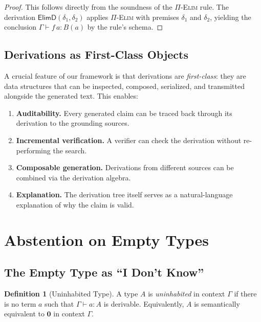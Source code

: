 \documentclass[11pt,a4paper]{article}
\theoremstyle{plain}
\theoremstyle{definition}
\newtheorem{definition}[theorem]{Definition}
\theoremstyle{remark}
\begin{document}
\begin{proof}
This follows directly from the soundness of the \textsc{$\Pi$-Elim} rule.
The derivation $\mathsf{ElimD}(\delta_1, \delta_2)$ applies \textsc{$\Pi$-Elim} with premises $\delta_1$ and $\delta_2$, yielding the conclusion $\Gamma \vdash f\,a : B(a)$ by the rule's schema.
\end{proof}

\subsection{Derivations as First-Class Objects}

A crucial feature of our framework is that derivations are \emph{first-class}: they are data structures that can be inspected, composed, serialized, and transmitted alongside the generated text.
This enables:

\begin{enumerate}[nosep]
  \item \textbf{Auditability.} Every generated claim can be traced back through its derivation to the grounding sources.
  \item \textbf{Incremental verification.} A verifier can check the derivation without re-performing the search.
  \item \textbf{Composable generation.} Derivations from different sources can be combined via the derivation algebra.
  \item \textbf{Explanation.} The derivation tree itself serves as a natural-language explanation of why the claim is valid.
\end{enumerate}


\section{Abstention on Empty Types}\label{sec:abstention}

\subsection{The Empty Type as ``I Don't Know''}

\begin{definition}[Uninhabited Type]\label{def:uninhabited}
A type $A$ is \emph{uninhabited} in context $\Gamma$ if there is no term $a$ such that $\Gamma \vdash a : A$ is derivable.
Equivalently, $A$ is semantically equivalent to $\mathbf{0}$ in context $\Gamma$.
\end{definition}
\end{document}
